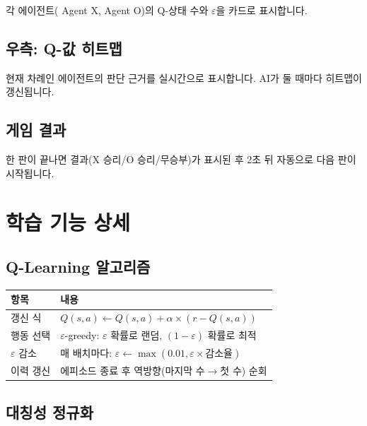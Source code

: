\documentclass[11pt,a4paper]{article}
\begin{document}
각 에이전트( Agent X,  Agent O)의 Q-상태 수와 \(\varepsilon\)을 카드로 표시합니다.

\subsection{우측: Q-값 히트맵}

현재 차례인 에이전트의 판단 근거를 실시간으로 표시합니다. AI가 둘 때마다 히트맵이 갱신됩니다.

\subsection{게임 결과}

한 판이 끝나면 결과(X 승리/O 승리/무승부)가 표시된 후 2초 뒤 자동으로 다음 판이 시작됩니다.

\section{학습 기능 상세}

\subsection{Q-Learning 알고리즘}

\begin{center}
\renewcommand{\arraystretch}{1.4}
\begin{tabular}{|l|p{8cm}|}
\hline
\rowcolor{tableheader}
\textbf{항목} & \textbf{내용} \\
\hline
갱신 식 & \(Q(s,a) \leftarrow Q(s,a) + \alpha \times (r - Q(s,a))\) \\
\hline
행동 선택 & \(\varepsilon\)-greedy: \(\varepsilon\) 확률로 랜덤, \((1-\varepsilon)\) 확률로 최적 \\
\hline
\(\varepsilon\) 감소 & 매 배치마다: \(\varepsilon \leftarrow \max(0.01, \varepsilon \times \text{감소율})\) \\
\hline
이력 갱신 & 에피소드 종료 후 역방향(마지막 수\(\to\)첫 수) 순회 \\
\hline
\end{tabular}
\end{center}

\subsection{대칭성 정규화}
\end{document}
